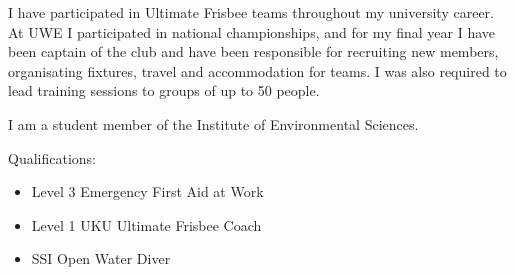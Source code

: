 \documentclass[11pt,a4paper]{article}
\begin{document}
I have participated in Ultimate Frisbee teams throughout my university
career. At UWE I participated in national championships, and for my final year
I have been captain of the club and have been responsible for recruiting new members,
organisating fixtures, travel and accommodation for teams. I was also required to lead 
training sessions to groups of up to 50 people.

I am a student member of the Institute of Environmental Sciences.

Qualifications:
\begin{itemize}
  \item Level 3 Emergency First Aid at Work    
  \item Level 1 UKU Ultimate Frisbee Coach
  \item SSI Open Water Diver
\end{itemize}
\end{document}
